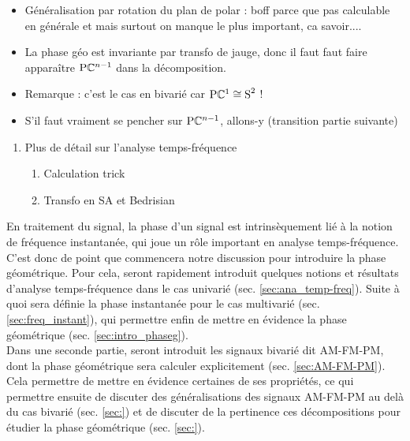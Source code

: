 \begin{enumerate}[label=\arabic* --- ]
\begin{enumerate}[label=\arabic{enumi}.\arabic* --- ]
\begin{itemize}
			\item Généralisation par rotation du plan de polar : boff parce que pas calculable en générale et mais surtout on manque le plus important, ca savoir.... 
			
			\item La phase géo est invariante par transfo de jauge, donc il faut faut faire apparaître $\text{\normalfont P}\mathbb{C}^{n-1}$ dans la décomposition.
			
			\item Remarque : c'est le cas en bivarié car $\text{\normalfont P}\mathbb{C}^{1}\cong \text{\normalfont S}^{2}$ !
			
			\item S'il faut vraiment se pencher sur $\text{\normalfont P}\mathbb{C}^{n-1}$, allons-y (transition partie suivante)
			
		\end{itemize}
	\end{enumerate}
\end{enumerate}

\begin{enumerate}[label=\Alph* --- ] \bfseries
	\item Plus de détail sur l'analyse temps-fréquence
	\begin{enumerate}[label=\Alph{enumi}.\arabic* --- ]
		
		\item Calculation trick
		
		\item Transfo en SA et Bedrisian
		
	\end{enumerate}
\end{enumerate}

\newpage


En traitement du signal, la phase d'un signal est intrinsèquement lié à la notion de fréquence instantanée, qui joue un rôle important en analyse temps-fréquence. 
C'est donc de point que commencera notre discussion pour introduire la phase géométrique.
Pour cela, seront rapidement introduit quelques notions et résultats d'analyse temps-fréquence dans le cas univarié (sec. \ref{sec:ana_temp-freq}). Suite à quoi sera définie la phase instantanée pour le cas multivarié (sec. \ref{sec:freq_instant}), qui permettre enfin de mettre en évidence la phase géométrique (sec. \ref{sec:intro_phaseg}).
\\

Dans une seconde partie, seront introduit les signaux bivarié dit AM-FM-PM, dont la phase géométrique sera calculer explicitement (sec. \ref{sec:AM-FM-PM}). Cela permettre de mettre en évidence certaines de ses propriétés, ce qui permettre ensuite de discuter des généralisations des signaux AM-FM-PM au delà du cas bivarié (sec. \ref{sec:}) et de discuter de la pertinence ces décompositions pour étudier la phase géométrique (sec. \ref{sec:}).

